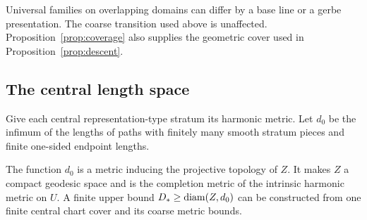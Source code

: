 Universal families on overlapping domains can differ by a base
line or a gerbe presentation. The coarse transition used above is
unaffected. Proposition~\ref{prop:coverage} also supplies the
geometric cover used in Proposition~\ref{prop:descent}.

\subsection{The central length space}
Give each central representation-type stratum its harmonic metric.
Let \(d_0\) be the infimum of the lengths of paths with finitely
many smooth stratum pieces and finite one-sided endpoint lengths.

\begin{proposition}\label{prop:central-completion}
The function \(d_0\) is a metric inducing the projective topology
of \(Z\). It makes \(Z\) a compact geodesic space and is the
completion metric of the intrinsic harmonic metric on \(U\).
A finite upper bound \(D_*\ge\operatorname{diam}(Z,d_0)\) can be constructed
from one finite central chart cover and its coarse metric bounds.
\end{proposition}

